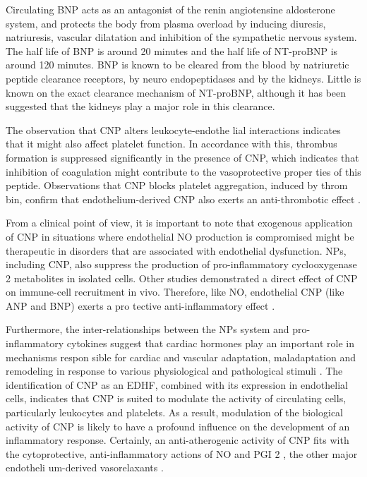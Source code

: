 \documentclass[14pt,a4paper,onecolumn]{extarticle}
\begin{document}
Circulating BNP acts as an antagonist of the renin angiotensine aldosterone system, and protects the body from plasma overload by inducing diuresis, natriuresis, vascular dilatation and inhibition of the sympathetic nervous system. The half life of BNP is around 20 minutes and the half life of NT-proBNP is around 120 minutes. BNP is known to be cleared from the blood by natriuretic peptide clearance receptors, by neuro endopeptidases and by the kidneys. Little is known on the exact clearance mechanism of NT-proBNP, although it has been suggested that the kidneys play a major role in this clearance. \citep{Hall2005} %

The observation that CNP alters leukocyte-endothe lial interactions indicates that it might also affect platelet function. In accordance with this, thrombus formation is suppressed significantly in the presence of CNP, which indicates that inhibition of coagulation might contribute to the vasoprotective proper ties of this peptide. Observations that CNP blocks platelet aggregation, induced by throm bin, confirm that endothelium-derived CNP also exerts an anti-thrombotic effect \citep{267}. %

From a clinical point of view, it is important to note that exogenous application of CNP in situations where endothelial NO production is compromised might be therapeutic in disorders that are associated with endothelial dysfunction. NPs, including CNP, also suppress the production of pro-inflammatory cyclooxygenase 2 metabolites in isolated cells. Other studies demonstrated a direct effect of CNP on immune-cell recruitment in vivo. Therefore, like NO, endothelial CNP (like ANP and BNP) exerts a pro tective anti-inflammatory effect \citep{283}. %

Furthermore, the inter-relationships between the NPs system and pro-inflammatory cytokines suggest that cardiac hormones play an important role in mechanisms respon sible for cardiac and vascular adaptation, maladaptation and remodeling in response to various physiological and pathological stimuli \citep{32} \citep{35}. The identification of CNP as an EDHF, combined with its expression in endothelial cells, indicates that CNP is suited to modulate the activity of circulating cells, particularly leukocytes and platelets.  As a result, modulation of the biological activity of CNP is likely to have a profound influence on the development of an inflammatory response. Certainly, an anti-atherogenic activity of CNP fits with the cytoprotective, anti-inflammatory actions of NO and PGI 2 , the other major endotheli um-derived vasorelaxants \citep{267} \citep{269} \citep{270} \citep{271}. %
\end{document}

